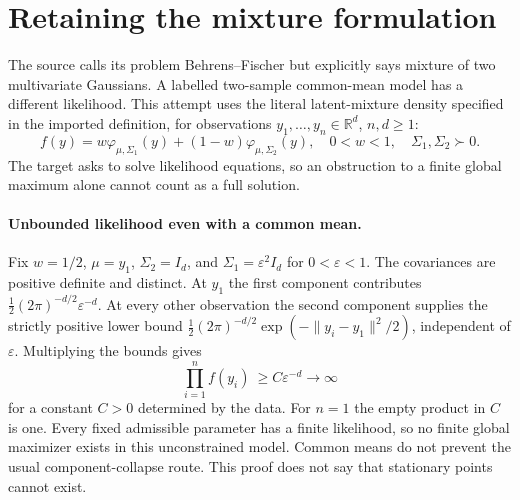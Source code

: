 \documentclass[11pt]{article}
\begin{document}
\section{Retaining the mixture formulation}
The source calls its problem Behrens--Fischer but explicitly says mixture
of two multivariate Gaussians. A labelled two-sample common-mean model
has a different likelihood. This attempt uses the literal latent-mixture
density specified in the imported definition, for observations
$y_1,\ldots,y_n\in\mathbb R^d$, $n,d\ge1$:
\[
f(y)=w\varphi_{\mu,\Sigma_1}(y)+(1-w)\varphi_{\mu,\Sigma_2}(y),
\quad 0<w<1,\quad\Sigma_1,\Sigma_2\succ0.
\]
The target asks to solve likelihood equations, so an obstruction to a
finite global maximum alone cannot count as a full solution.

\paragraph{Unbounded likelihood even with a common mean.}
Fix $w=1/2$, $\mu=y_1$, $\Sigma_2=I_d$, and
$\Sigma_1=\varepsilon^2 I_d$ for $0<\varepsilon<1$.
The covariances are positive definite and distinct. At $y_1$ the first
component contributes
$\tfrac12(2\pi)^{-d/2}\varepsilon^{-d}$.
At every other observation the second component supplies the strictly
positive lower bound
$\tfrac12(2\pi)^{-d/2}\exp(-\|y_i-y_1\|^2/2)$, independent of
$\varepsilon$. Multiplying the bounds gives
\[
\prod_{i=1}^n f(y_i)\ \ge C\varepsilon^{-d}\longrightarrow\infty
\]
for a constant $C>0$ determined by the data. For $n=1$ the empty
product in $C$ is one. Every fixed admissible parameter has a finite
likelihood, so no finite global maximizer exists in this unconstrained
model. Common means do not prevent the usual component-collapse route.
This proof does not say that stationary points cannot exist.
\end{document}
